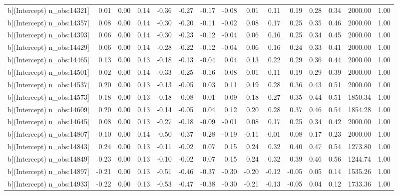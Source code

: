 \begin{table}[ht]
\begin{tabular}{rrrrrrrrrrrrrrr}
  b[(Intercept) n\_obs:14321] & 0.01 & 0.00 & 0.14 & -0.36 & -0.27 & -0.17 & -0.08 & 0.01 & 0.11 & 0.19 & 0.28 & 0.34 & 2000.00 & 1.00 \\ 
  b[(Intercept) n\_obs:14357] & 0.08 & 0.00 & 0.14 & -0.30 & -0.20 & -0.11 & -0.02 & 0.08 & 0.17 & 0.25 & 0.35 & 0.46 & 2000.00 & 1.00 \\ 
  b[(Intercept) n\_obs:14393] & 0.06 & 0.00 & 0.14 & -0.30 & -0.23 & -0.12 & -0.04 & 0.06 & 0.16 & 0.25 & 0.34 & 0.45 & 2000.00 & 1.00 \\ 
  b[(Intercept) n\_obs:14429] & 0.06 & 0.00 & 0.14 & -0.28 & -0.22 & -0.12 & -0.04 & 0.06 & 0.16 & 0.24 & 0.33 & 0.41 & 2000.00 & 1.00 \\ 
  b[(Intercept) n\_obs:14465] & 0.13 & 0.00 & 0.13 & -0.18 & -0.13 & -0.04 & 0.04 & 0.13 & 0.22 & 0.29 & 0.36 & 0.44 & 2000.00 & 1.00 \\ 
  b[(Intercept) n\_obs:14501] & 0.02 & 0.00 & 0.14 & -0.33 & -0.25 & -0.16 & -0.08 & 0.01 & 0.11 & 0.19 & 0.29 & 0.39 & 2000.00 & 1.00 \\ 
  b[(Intercept) n\_obs:14537] & 0.20 & 0.00 & 0.13 & -0.13 & -0.05 & 0.03 & 0.11 & 0.19 & 0.28 & 0.36 & 0.43 & 0.51 & 2000.00 & 1.00 \\ 
  b[(Intercept) n\_obs:14573] & 0.18 & 0.00 & 0.13 & -0.18 & -0.08 & 0.01 & 0.09 & 0.18 & 0.27 & 0.35 & 0.44 & 0.51 & 1850.34 & 1.00 \\ 
  b[(Intercept) n\_obs:14609] & 0.20 & 0.00 & 0.13 & -0.14 & -0.05 & 0.04 & 0.12 & 0.20 & 0.28 & 0.37 & 0.46 & 0.54 & 1854.28 & 1.00 \\ 
  b[(Intercept) n\_obs:14645] & 0.08 & 0.00 & 0.13 & -0.27 & -0.18 & -0.09 & -0.01 & 0.08 & 0.17 & 0.25 & 0.34 & 0.42 & 2000.00 & 1.00 \\ 
  b[(Intercept) n\_obs:14807] & -0.10 & 0.00 & 0.14 & -0.50 & -0.37 & -0.28 & -0.19 & -0.11 & -0.01 & 0.08 & 0.17 & 0.23 & 2000.00 & 1.00 \\ 
  b[(Intercept) n\_obs:14843] & 0.24 & 0.00 & 0.13 & -0.11 & -0.02 & 0.07 & 0.15 & 0.24 & 0.32 & 0.40 & 0.47 & 0.54 & 1273.80 & 1.00 \\ 
  b[(Intercept) n\_obs:14849] & 0.23 & 0.00 & 0.13 & -0.10 & -0.02 & 0.07 & 0.15 & 0.24 & 0.32 & 0.39 & 0.46 & 0.56 & 1244.74 & 1.00 \\ 
  b[(Intercept) n\_obs:14897] & -0.21 & 0.00 & 0.13 & -0.51 & -0.46 & -0.37 & -0.30 & -0.20 & -0.12 & -0.05 & 0.05 & 0.14 & 1535.26 & 1.00 \\ 
  b[(Intercept) n\_obs:14933] & -0.22 & 0.00 & 0.13 & -0.53 & -0.47 & -0.38 & -0.30 & -0.21 & -0.13 & -0.05 & 0.04 & 0.12 & 1733.36 & 1.00 \\ 

\end{tabular}
\end{table}
